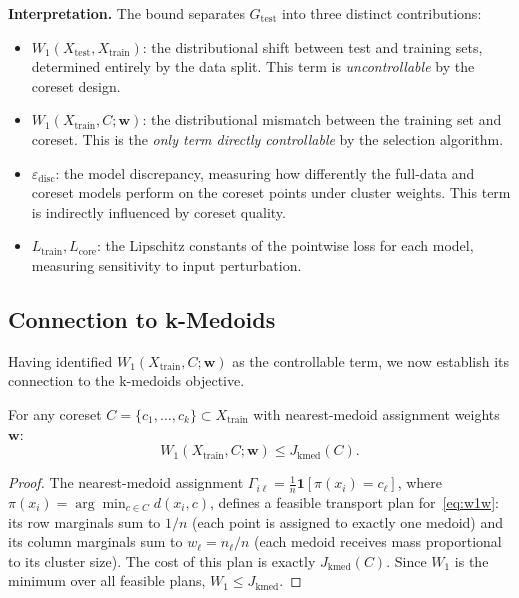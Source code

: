 \documentclass[journal]{IEEEtran}
\newcommand{\Wone}{W_1}
\newcommand{\Xtrain}{X_{\mathrm{train}}}
\newcommand{\Xtest}{X_{\mathrm{test}}}
\newcommand{\Ltrain}{L_{\mathrm{train}}}
\newcommand{\Lcore}{L_{\mathrm{core}}}
\newcommand{\edisc}{\varepsilon_{\mathrm{disc}}}
\newcommand{\Gtest}{G_{\mathrm{test}}}
\newcommand{\Jkmed}{J_{\mathrm{kmed}}}
\begin{document}
\textbf{Interpretation.}
The bound separates $\Gtest$ into three distinct contributions:
\begin{itemize}
  \item $\Wone(\Xtest, \Xtrain)$: the distributional shift between
    test and training sets, determined entirely by the data split.
    This term is \emph{uncontrollable} by the coreset design.

  \item $\Wone(\Xtrain, C; \mathbf{w})$: the distributional mismatch
    between the training set and coreset.
    This is the \emph{only term directly controllable} by the
    selection algorithm.

  \item $\edisc$: the model discrepancy, measuring how differently
    the full-data and coreset models perform on the coreset points
    under cluster weights.
    This term is indirectly influenced by coreset quality.

  \item $\Ltrain, \Lcore$: the Lipschitz constants of the pointwise
    loss for each model, measuring sensitivity to input perturbation.
\end{itemize}


\subsection{Connection to k-Medoids}
\label{sec:theory-kmed}

Having identified $\Wone(\Xtrain, C; \mathbf{w})$ as the
controllable term, we now establish its connection to the k-medoids
objective.

\begin{proposition}\label{prop:kmed}
For any coreset $C = \{c_1, \ldots, c_k\} \subset \Xtrain$ with
nearest-medoid assignment weights~$\mathbf{w}$:
\begin{equation}\label{eq:kmed-w1}
  \Wone(\Xtrain, C; \mathbf{w}) \le \Jkmed(C).
\end{equation}
\end{proposition}

\begin{proof}
The nearest-medoid assignment
$\Gamma_{i\ell} = \frac{1}{n} \mathbf{1}[\pi(x_i) = c_\ell]$,
where $\pi(x_i) = \arg\min_{c \in C} d(x_i, c)$,
defines a feasible transport plan for~\eqref{eq:w1w}:
its row marginals sum to $1/n$ (each point is assigned to exactly
one medoid) and its column marginals sum to $w_\ell = n_\ell / n$
(each medoid receives mass proportional to its cluster size).
The cost of this plan is exactly $\Jkmed(C)$.
Since $\Wone$ is the minimum over all feasible plans,
$\Wone \le \Jkmed$.
\end{proof}
\end{document}

